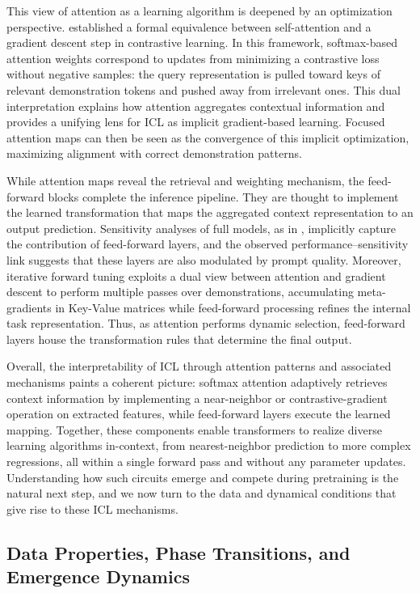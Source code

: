 \documentclass[11pt]{article}
\begin{document}
This view of attention as a learning algorithm is deepened by an optimization perspective. \cite{ref13} established a formal equivalence between self-attention and a gradient descent step in contrastive learning. In this framework, softmax-based attention weights correspond to updates from minimizing a contrastive loss without negative samples: the query representation is pulled toward keys of relevant demonstration tokens and pushed away from irrelevant ones. This dual interpretation explains how attention aggregates contextual information and provides a unifying lens for ICL as implicit gradient-based learning. Focused attention maps can then be seen as the convergence of this implicit optimization, maximizing alignment with correct demonstration patterns.

While attention maps reveal the retrieval and weighting mechanism, the feed-forward blocks complete the inference pipeline. They are thought to implement the learned transformation that maps the aggregated context representation to an output prediction. Sensitivity analyses of full models, as in \cite{ref64}, implicitly capture the contribution of feed-forward layers, and the observed performance--sensitivity link suggests that these layers are also modulated by prompt quality. Moreover, iterative forward tuning \cite{ref65} exploits a dual view between attention and gradient descent to perform multiple passes over demonstrations, accumulating meta-gradients in Key-Value matrices while feed-forward processing refines the internal task representation. Thus, as attention performs dynamic selection, feed-forward layers house the transformation rules that determine the final output.

Overall, the interpretability of ICL through attention patterns and associated mechanisms paints a coherent picture: softmax attention adaptively retrieves context information by implementing a near-neighbor or contrastive-gradient operation on extracted features, while feed-forward layers execute the learned mapping. Together, these components enable transformers to realize diverse learning algorithms in-context, from nearest-neighbor prediction to more complex regressions, all within a single forward pass and without any parameter updates. Understanding how such circuits emerge and compete during pretraining is the natural next step, and we now turn to the data and dynamical conditions that give rise to these ICL mechanisms.

\subsection{Data Properties, Phase Transitions, and Emergence Dynamics}
\end{document}
